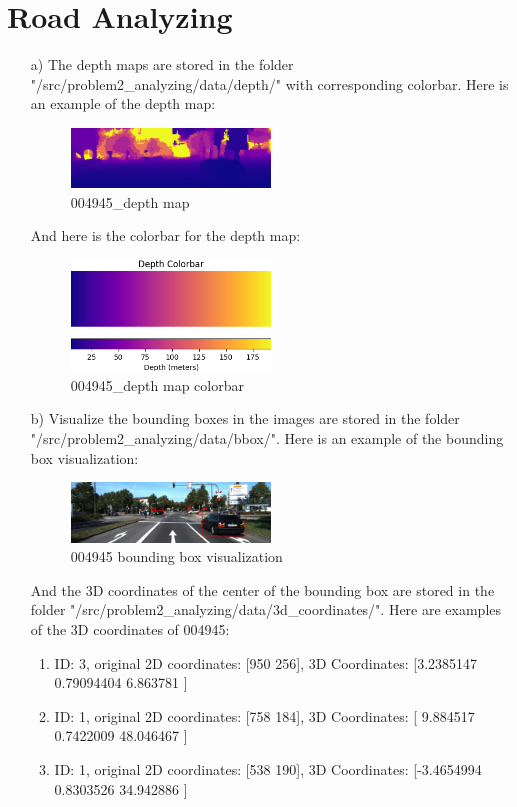 \documentclass[]{article}
\begin{document}
\section{Road Analyzing}
\begin{enumerate}
	\item[a)] The depth maps are stored in the folder "/src/problem2\_analyzing/data/depth/" with corresponding colorbar. Here is an example of the depth map:
	\begin{figure}[h]
		\centering
		\includegraphics[width=0.5\textwidth]{src/problem2_analyzing/data/depth/004945_depth.png}
		\caption{004945\_depth map}
		\label{fig:depth_map_example}
	\end{figure}
	\newpage
	And here is the colorbar for the depth map:
	\begin{figure}[h]
		\centering
		\includegraphics[width=0.5\textwidth]{src/problem2_analyzing/data/depth/004945_colorbar.png}
		\caption{004945\_depth map colorbar}
		\label{fig:colorbar}
	\end{figure}
	\item[b)] Visualize the bounding boxes in the images are stored in the folder "/src/problem2\_analyzing/data/bbox/". Here is an example of the bounding box visualization:
	\begin{figure}[h]
		\centering
		\includegraphics[width=0.5\textwidth]{src/problem2_analyzing/data/bbox/004945_bbox.png}
		\caption{004945 bounding box visualization}
		\label{fig:bbox_visualization}
	\end{figure}
	And the 3D coordinates of the center of the bounding box are stored in the folder "/src/problem2\_analyzing/data/3d\_coordinates/". Here are examples of the 3D coordinates of 004945:
		\begin{enumerate}
			\item ID: 3, original 2D coordinates: [950 256], 3D Coordinates: [3.2385147  0.79094404 6.863781  ]
			\item ID: 1, original 2D coordinates: [758 184], 3D Coordinates: [ 9.884517   0.7422009 48.046467 ]
			\item ID: 1, original 2D coordinates: [538 190], 3D Coordinates: [-3.4654994  0.8303526 34.942886 ]
		\end{enumerate}
\end{enumerate}
\end{document}
